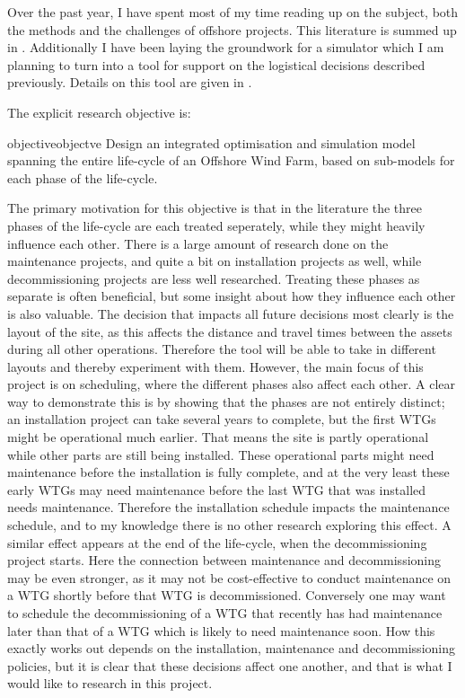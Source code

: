 \documentclass[a4paper,12pt]{article}
\begin{document}
Over the past year, I have spent most of my time reading up on the subject, both the methods and the challenges of offshore projects. This literature is summed up in . Additionally I have been laying the groundwork for a simulator which I am planning to turn into a tool for support on the logistical decisions described previously. Details on this tool are given in .

\bigskip

The explicit research objective is: 

\begin{restatable}{objective}{objectve}
\label{objectve}
Design an integrated optimisation and simulation model spanning the entire life-cycle of an Offshore Wind Farm, based on sub-models for each phase of the life-cycle.
\end{restatable}

The primary motivation for this objective is that in the literature the three phases of the life-cycle are each treated seperately, while they might heavily influence each other. There is a large amount of research done on the maintenance projects, and quite a bit on installation projects as well, while decommissioning projects are less well researched. Treating these phases as separate is often beneficial, but some insight about how they influence each other is also valuable. The decision that impacts all future decisions most clearly is the layout of the site, as this affects the distance and travel times between the assets during all other operations. Therefore the tool will be able to take in different layouts and thereby experiment with them. However, the main focus of this project is on scheduling, where the different phases also affect each other. A clear way to demonstrate this is by showing that the phases are not entirely distinct; an installation project can take several years to complete, but the first WTGs might be operational much earlier. That means the site is partly operational while other parts are still being installed. These operational parts might need maintenance before the installation is fully complete, and at the very least these early WTGs may need maintenance before the last WTG that was installed needs maintenance. Therefore the installation schedule impacts the maintenance schedule, and to my knowledge there is no other research exploring this effect. A similar effect appears at the end of the life-cycle, when the decommissioning project starts. Here the connection between maintenance and decommissioning may be even stronger, as it may not be cost-effective to conduct maintenance on a WTG shortly before that WTG is decommissioned. Conversely one may want to schedule the decommissioning of a WTG that recently has had maintenance later than that of a WTG which is likely to need maintenance soon. How this exactly works out depends on the installation, maintenance and decommissioning policies, but it is clear that these decisions affect one another, and that is what I would like to research in this project. 
\end{document}
